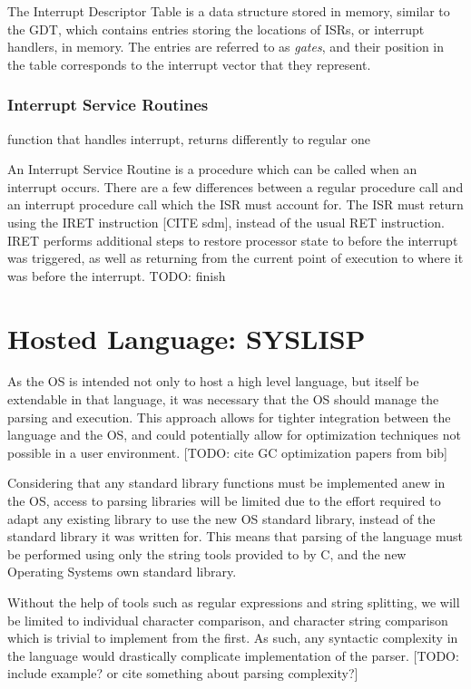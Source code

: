 \documentclass[11pt]{report}
\begin{document}
The Interrupt Descriptor Table is a data structure stored in memory, similar to the GDT, which contains entries storing the locations of ISRs, or interrupt handlers, in memory. The entries are referred to as \textit{gates}, and their position in the table corresponds to the interrupt vector that they represent.

\subsubsection{Interrupt Service Routines}
function that handles interrupt, returns differently to regular one

An Interrupt Service Routine is a procedure which can be called when an interrupt occurs. There are a few differences between a regular procedure call and an interrupt procedure call which the ISR must account for. The ISR must return using the IRET instruction [CITE sdm], instead of the usual RET instruction. IRET performs additional steps to restore processor state to before the interrupt was triggered, as well as returning from the current point of execution to where it was before the interrupt.
TODO: finish


\section{Hosted Language: SYSLISP}
As the OS is intended not only to host a high level language, but itself be extendable in that language, it was necessary that the OS should manage the parsing and execution. This approach allows for tighter integration between the language and the OS, and could potentially allow for optimization techniques not possible in a user environment. [TODO: cite GC optimization papers from bib]

Considering that any standard library functions must be implemented anew in the OS, access to parsing libraries will be limited due to the effort required to adapt any existing library to use the new OS standard library, instead of the standard library it was written for. This means that parsing of the language must be performed using only the string tools provided to by C, and the new Operating Systems own standard library.

Without the help of tools such as regular expressions and string splitting, we will be limited to individual character comparison, and character string comparison which is trivial to implement from the first. As such, any syntactic complexity in the language would drastically complicate implementation of the parser. [TODO: include example? or cite something about parsing complexity?]
\end{document}
